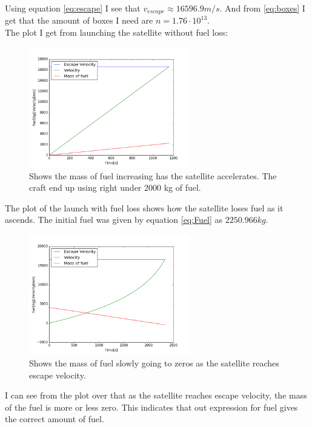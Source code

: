 \documentclass[a4paper, 10pt]{article}
\begin{document}
Using equation \ref{eq:escape} I see that $v_{escape} \approx 16596.9 m/s$. And from \ref{eq:boxes} I get that the amount of boxes I need are $n = 1.76 \cdot 10^{13}$. \\

The plot I get from launching the satellite without fuel loss:


\begin{figure}[H]
\begin{center}
\includegraphics[width = 70mm]{part1launchConstMass.png}
\caption{Shows the mass of fuel increasing has the satellite accelerates. The craft end up using right under 2000 kg of fuel.}
\end{center}
\end{figure}

The plot of the launch with fuel loss shows how the satellite loses fuel as it ascends. The initial fuel was given by equation \ref{eq:Fuel} as $2250.966 kg$.


\begin{figure}[H]
\begin{center}
\includegraphics[width = 70mm]{part1launchVarMass.png}
\caption{Shows the mass of fuel slowly going to zeros as the satellite reaches escape velocity.}
\end{center}
\end{figure}

I can see from the plot over that as the satellite reaches escape velocity, the mass of the fuel is more or less zero. This indicates that out expression for fuel gives the correct amount of fuel.
\end{document}
